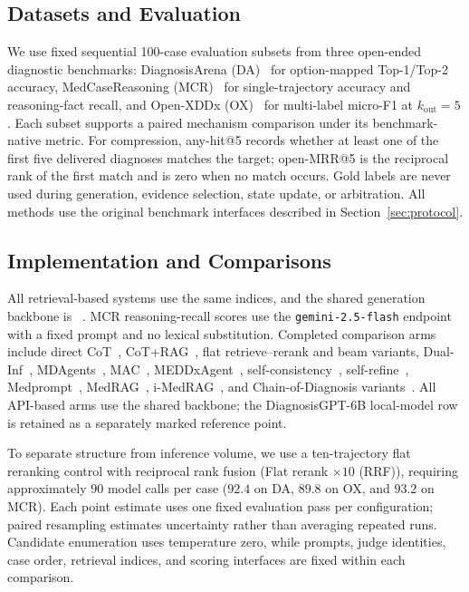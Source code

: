 \documentclass[letterpaper]{article} %
\begin{document}
\subsection{Datasets and Evaluation}
\label{sec:data}

We use fixed sequential 100-case evaluation subsets from three open-ended diagnostic benchmarks:
DiagnosisArena (DA)~\cite{diagnosisarena} for option-mapped Top-1/Top-2 accuracy,
MedCaseReasoning (MCR)~\cite{medcasereasoning} for single-trajectory accuracy and reasoning-fact recall, and
Open-XDDx (OX)~\cite{dualinf2025} for multi-label micro-F1 at $k_{\mathrm{out}}{=}5$.
Each subset supports a paired mechanism comparison under its benchmark-native metric.
For compression, any-hit@5 records whether at least one of the first five delivered diagnoses matches the target; open-MRR@5 is the reciprocal rank of the first match and is zero when no match occurs.
Gold labels are never used during generation, evidence selection, state update, or arbitration.
All methods use the original benchmark interfaces described in Section~\ref{sec:protocol}.

\subsection{Implementation and Comparisons}
\label{sec:backbone}
\label{sec:baselines}

All retrieval-based systems use the same indices, and the shared generation backbone is ~\cite{llama33}.
MCR reasoning-recall scores use the \texttt{gemini-2.5-flash} endpoint~\cite{gemini25flash} with a fixed prompt and no lexical substitution.
Completed comparison arms include direct CoT~\cite{wei2022cot}, CoT+RAG~\cite{lewis2020rag,xiong2024medrag}, flat retrieve--rerank and beam variants, Dual-Inf~\cite{dualinf2025}, MDAgents~\cite{mdagents}, MAC~\cite{chen2025mac,mac2026}, MEDDxAgent~\cite{meddxagent2025}, self-consistency~\cite{wang2023selfconsistency}, self-refine~\cite{madaan2023selfrefine}, Medprompt~\cite{medprompt}, MedRAG~\cite{medrag}, i-MedRAG~\cite{imedrag}, and Chain-of-Diagnosis variants~\cite{chainofdiagnosis}.
All API-based arms use the shared backbone; the DiagnosisGPT-6B local-model row is retained as a separately marked reference point.

To separate structure from inference volume, we use a ten-trajectory flat reranking control with reciprocal rank fusion (Flat rerank $\times 10$ (RRF)), requiring approximately $90$ model calls per case ($92.4$ on DA, $89.8$ on OX, and $93.2$ on MCR).
Each point estimate uses one fixed evaluation pass per configuration; paired resampling estimates uncertainty rather than averaging repeated runs.
Candidate enumeration uses temperature zero, while prompts, judge identities, case order, retrieval indices, and scoring interfaces are fixed within each comparison.
\end{document}
